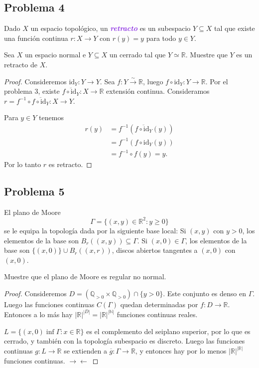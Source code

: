 \documentclass{article}
\theoremstyle{definition}
\theoremstyle{remark}
\numberwithin{equation}{section}
\newcommand{\N}{\mathbb{N}}
\newcommand{\Q}{\mathbb{Q}}
\newcommand{\R}{\mathbb{R}}
\renewcommand{\bar}{\overline}
\newcommand{\id}{\mathrm{id}}
\newcommand{\abs}[1]{\left| #1 \right|}
\newcommand{\wea}[1]{\textcolor{BlueViolet}{\textbf{\emph{#1}}}}
\begin{document}
\newpage
\subsection{Problema 4}
Dado $X$ un espacio topológico, un \wea{retracto} es un subespacio $Y \subseteq X$ tal que existe una función continua $r \colon X \to Y$ con $r(y) = y$ para todo $y \in Y$.

Sea $X$ un espacio normal e $Y \subseteq X$ un cerrado tal que $Y \simeq \R$. Muestre que $Y$ es un retracto de $X$.

\begin{proof}
  Consideremos $\id_Y \colon Y \to Y$. Sea $f \colon Y \xrightarrow\sim \R$, luego $f \circ \id_Y \colon Y \to \R$. Por el problema 3, existe $\bar{f \circ \id_Y} \colon X \to \R$ extensión continua.
  Consideramos $r = f^{-1} \circ \bar{f \circ \id_Y} \colon X \to Y$.

  Para $y \in Y$ tenemos
  \begin{align*}
    r(y) &= f^{-1}(\bar{f \circ \id_Y}(y)) \\
    &= f^{-1}(f \circ \id_Y(y)) \\
    &= f^{-1} \circ f (y) = y.
  \end{align*}
  Por lo tanto $r$ es retracto.
\end{proof}

\newpage
\subsection{Problema 5}
El plano de Moore $$\Gamma = \{(x,y) \in \R^2 \colon y \geq 0\}$$ se le equipa la topología dada por la siguiente base local: Si $(x,y)$ con $y > 0$, los elementos de la base son $B_r((x,y)) \subseteq \Gamma$. Si $(x,0) \in \Gamma$, los elementos de la base son $\{(x,0)\} \cup B_r((x,r))$, discos abiertos tangentes a $(x,0)$ con $(x,0)$.

Muestre que el plano de Moore es regular no normal.
\begin{proof}
  Consideremos $D = (\Q_{>0} \times \Q_{>0}) \cap \{y>0\}$. Este conjunto es denso en $\Gamma$. Luego las funciones continuas $C(\Gamma)$ quedan determinadas por $f \colon D \to \R$. Entonces a lo más hay $\abs{\R}^{\abs D} = \abs{\R}^{\abs\N}$ funciones continuas reales.

  $L = \{(x,0) \inf\Gamma \colon x \in \R\}$ es el complemento del seiplano superior, por lo que es cerrado, y también con la topología subespacio es discreto. Luego las funciones continuas $g \colon L \to \R$ se extienden a $\bar g \colon \Gamma \to \R$, y entonces hay por lo menos $\abs\R^{\abs\R}$ funciones continuas. $\to\gets$
\end{proof}
\end{document}
